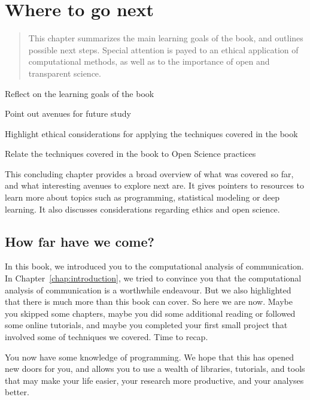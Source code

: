 \chapter{Where to go next}
\label{chap:wherenext}

\begin{abstract}
This chapter summarizes the main learning goals of the book, and outlines possible next steps. Special attention is payed to an ethical application of computational methods, as well as to the importance of open and transparent science.
\end{abstract}



\begin{objectives}
\item Reflect on the learning goals of the book
\item Point out avenues for future study
\item Highlight ethical considerations for applying the techniques covered in the book
\item Relate the techniques covered in the book to Open Science practices
\end{objectives}

\begin{feature}
This concluding chapter provides a broad overview of what was covered so far, and what interesting avenues to explore next are. It gives pointers to resources to learn more about topics such as programming, statistical modeling or deep learning. It also discusses considerations regarding ethics and open science.

\end{feature}



\section{How far have we come?}
In this book, we introduced you to the computational analysis of communication. In Chapter~\ref{chap:introduction}, we tried to convince you that the computational analysis of communication is a worthwhile endeavour. But we also highlighted that there is much more than this book can cover.
So here we are now. Maybe you skipped some chapters, maybe you did some additional reading or followed some online tutorials, and maybe you completed your first small project that involved some of techniques we covered. Time to recap.

You now have some knowledge of programming. We hope that this has opened new doors for you, and allows you to use a wealth of libraries, tutorials, and tools that may make your life easier, your research more productive, and your analyses better.

